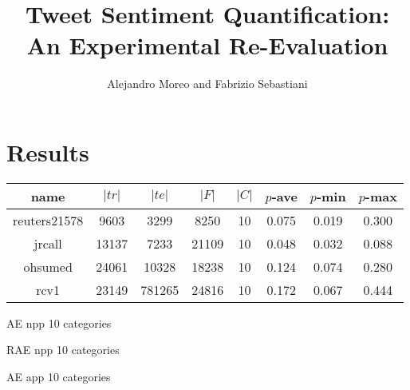 \documentclass[10pt,a4paper]{article}
\title{Tweet Sentiment Quantification: \\ An Experimental
Re-Evaluation}
\author{Alejandro Moreo and Fabrizio Sebastiani}
\begin{document}
\flushbottom
\thispagestyle{empty}




\section{Results}
\label{sec:results}

\begin{table}[ht!]
\begin{tabular}{|c||c|c|c|c|c|c|c|}\hline
    name & $|tr|$ & $|te|$ & $|F|$ & $|C|$ & $p$-ave & $p$-min & $p$-max \\\hline
reuters21578 & 9603 & 3299 & 8250 & 10 & 0.075 & 0.019 & 0.300\\\hline
jrcall & 13137 & 7233 & 21109 & 10 & 0.048 & 0.032 & 0.088\\\hline
ohsumed & 24061 & 10328 & 18238 & 10 & 0.124 & 0.074 & 0.280\\\hline
rcv1 & 23149 & 781265 & 24816 & 10 & 0.172 & 0.067 & 0.444\\\hline
\end{tabular}
\end{table}


\newpage

\begin{table}[h!]
\tiny
    \caption{AE npp 10 categories}
    \begin{center}
        

  \end{center}
  \label{tab:npp:ae}
\end{table}


\begin{table}[h!]
\tiny

    \caption{RAE npp 10 categories}
    \begin{center}

        

  \end{center}
  \label{tab:npp:rae}
\end{table}


\newpage

\begin{table}[h!]
\tiny

    \caption{AE app 10 categories}
    \begin{center}

        

  \end{center}
  \label{tab:app:ae}
\end{table}
\end{document}
